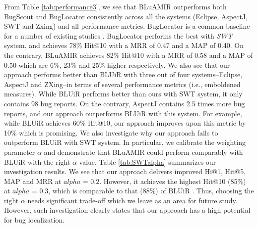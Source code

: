 \documentclass[conference]{IEEEtran}
\begin{document}
From Table \ref{tab:performance3}, we see that BLuAMIR outperforms both BugScout and BugLocator consistently across all the systems (Eclipse, AspectJ, SWT and Zxing) and all performance metrics.
BugLocator is a common baseline for a number of existing studies \cite{Saha,Wang2,Wang}. BugLocator performs the best with \emph{SWT} system, and achieves 78\% Hit@10 with a MRR of 0.47 and a MAP of 0.40. On the contrary, BLuAMIR achieves 82\% Hit@10 with a MRR of 0.58 and a MAP of 0.50 which are 6\%, 23\% and 25\% higher respectively. We also see that our approach performs better than BLUiR with three out of four systems--Eclipse, AspectJ and ZXing--in terms of several performance metrics (i.e., emboldened measures). While BLUiR performs better than ours with SWT system, it only contains 98 bug reports. On the contrary, AspectJ contains 2.5 times more bug reports, and our approach outperforms BLUiR with this system. For example, while BLUiR achieves 60\% Hit@10, our approach improves upon this metric by 10\% which is promising.      
We also investigate why our approach fails to outperform BLUiR with SWT system. In particular, we calibrate the weighting parameter $\alpha$ and demonstrate that BLuAMIR could perform comparably with BLUiR with the right $\alpha$ value. Table \ref{tab:SWTalpha} summarizes our investigation results. We see that our approach delivers improved Hi@1, Hit@5, MAP and MRR at $alpha$ = $0.2$. However, it achieves the highest Hit@10 (85\%) at $alpha$ = $0.3$, which is comparable to that (88\%) of BLUiR \cite{Saha}. Thus, choosing the right $\alpha$ needs significant trade-off which we leave as an area for future study. However, such investigation clearly states that our approach has a high potential for bug localization. 
     
\end{document}
